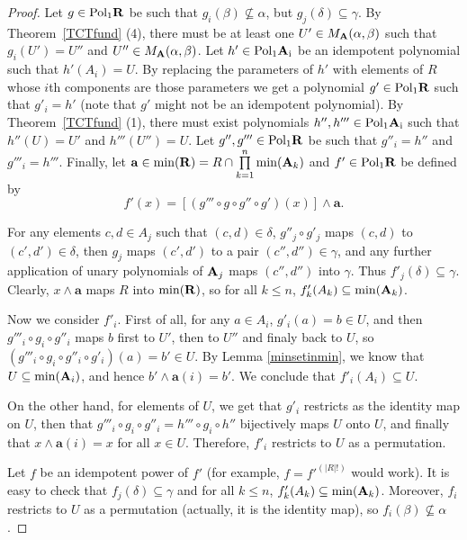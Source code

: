 \documentclass[11pt]{amsart}
\newcommand{\m}[1]{{\uppercase {\mathbf {#1}}}}
\newcommand{\poln}[2]{{\rm Pol_{#1}\m #2}}
\newcommand{\mt}{\wedge}
\theoremstyle{definition}
\begin{document}
\begin{proof}
Let $g\in\poln{1}{r}$ be such that $g_i(\beta)\nsubseteq\alpha$, but $g_j(\delta)\subseteq\gamma$. By Theorem~\ref{TCTfund} (4), there must be at least one $U'\in M_{\m a}(\alpha,\beta)$ such that $g_i(U')=U''$ and $U''\in M_{\m a}(\alpha,\beta)$. Let $h'\in\poln{1}{a_i}$ be an idempotent polynomial such that $h'(A_i)=U$. By replacing the parameters of $h'$ with elements of $R$ whose $i$th components are those parameters we get a polynomial $g'\in\poln{1}{r}$ such that $g'_i=h'$ (note that $g'$ might not be an idempotent polynomial). By Theorem~\ref{TCTfund} (1), there must exist polynomials $h'',h'''\in\poln{1}{a_i}$ such that $h''(U)=U'$ and $h'''(U'')=U$. Let $g'',g'''\in\poln{1}{r}$ be such that $g''_i=h''$ and $g'''_i=h'''$. Finally, let $\mathbf{a}\in\mathrm{min}(\m R)=R\cap\prod\limits_{k=1}^n\mathrm{min}(\m a_k)$ and $f'\in\poln{1}{r}$ be defined by
\[f'(x)=[(g'''\circ g\circ g''\circ g')(x)]\mt\mathbf{a}.\]

For any elements $c,d\in A_j$ such that $(c,d)\in\delta$, $g''_j\circ g'_j$ maps $(c,d)$ to $(c',d')\in \delta$, then $g_j$ maps $(c',d')$ to a pair $(c'',d'')\in\gamma$, and any further application of unary polynomials of $\m a_j$ maps $(c'',d'')$ into $\gamma$. Thus $f'_j(\delta)\subseteq\gamma$. Clearly, $x\mt \mathbf{a}$ maps $R$ into $\mathrm{min}(\m R)$, so for all $k\leq n$, $f'_k(A_k)\subseteq \mathrm{min}(\m a_k)$.

Now we consider $f'_i$. First of all, for any $a\in A_i$, $g'_i(a)=b\in U$, and then $g'''_i\circ g_i\circ g''_i$ maps $b$ first to $U'$, then to $U''$ and finaly back to $U$, so $(g'''_i\circ g_i\circ g''_i\circ g'_i)(a)=b'\in U$. By Lemma \ref{minsetinmin}, we know that $U\subseteq\mathrm{min}(\m a_i)$, and hence $b'\mt \mathbf{a}(i)=b'$. We conclude that $f'_i(A_i)\subseteq U$.

On the other hand, for elements of $U$, we get that $g'_i$ restricts as the identity map on $U$, then that $g'''_i\circ g_i\circ g''_i=h'''\circ g_i\circ h''$ bijectively maps $U$ onto $U$, and finally that $x\mt  \mathbf{a}(i)=x$ for all $x\in U$. Therefore, $f'_i$ restricts to $U$ as a permutation.

Let $f$ be an idempotent power of $f'$ (for example, $f=f'^{(|R|!)}$ would work). It is easy to check that $f_j(\delta)\subseteq \gamma$ and  for all $k\leq n$, $f'_k(A_k)\subseteq \mathrm{min}(\m a_k)$. Moreover, $f_i$ restricts to $U$ as a permutation (actually, it is the identity map), so $f_i(\beta)\nsubseteq \alpha$.
\end{proof}
\end{document}
